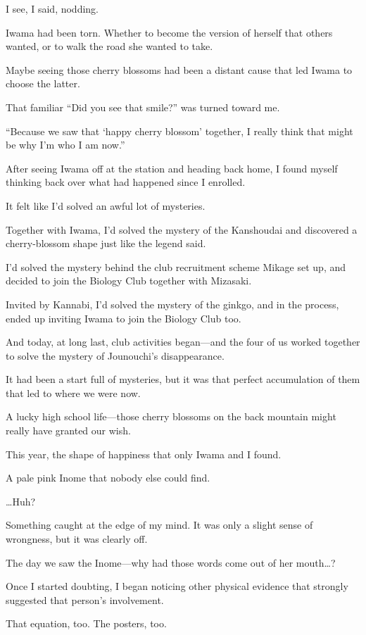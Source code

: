 \documentclass[
    a4paper,
    12pt,
    twoside,
    openany,
    UTF8,
    fontset=windows
]{ctexbook}
\begin{document}
I see, I said, nodding.

Iwama had been torn. Whether to become the version of herself that others wanted, or to walk the road she wanted to take.

Maybe seeing those cherry blossoms had been a distant cause that led Iwama to choose the latter.

That familiar ``Did you see that smile?'' was turned toward me.

``Because we saw that `happy cherry blossom' together, I really think that might be why I'm who I am now.''

After seeing Iwama off at the station and heading back home, I found myself thinking back over what had happened since I enrolled.

It felt like I'd solved an awful lot of mysteries.

Together with Iwama, I'd solved the mystery of the Kanshoudai and discovered a cherry-blossom shape just like the legend said.

I'd solved the mystery behind the club recruitment scheme Mikage set up, and decided to join the Biology Club together with Mizasaki.

Invited by Kannabi, I'd solved the mystery of the ginkgo, and in the process, ended up inviting Iwama to join the Biology Club too.

And today, at long last, club activities began---and the four of us worked together to solve the mystery of Jounouchi's disappearance.

It had been a start full of mysteries, but it was that perfect accumulation of them that led to where we were now.

A lucky high school life---those cherry blossoms on the back mountain might really have granted our wish.

This year, the shape of happiness that only Iwama and I found.

A pale pink Inome that nobody else could find.

\dots Huh?

Something caught at the edge of my mind. It was only a slight sense of wrongness, but it was clearly off.

The day we saw the Inome---why had those words come out of her mouth\dots?

Once I started doubting, I began noticing other physical evidence that strongly suggested that person's involvement.

That equation, too. The posters, too.
\end{document}
